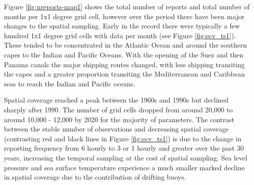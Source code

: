 Figure \ref{fig:nreports-map1} shows the total number of reports and total number of months per 1x1 degree grid cell, however over the period \datatimerange{} there have been major changes to the spatial sampling.
Early in the record there were typically a few hundred 1x1 degree grid cells with data per month (see Figure \ref{fig:ecv_ts1}).
These tended to be concentrated in the Atlantic Ocean and around the southern capes to the Indian and Pacific Oceans.
With the opening of the Suez and then Panama canals the major shipping routes changed, with less shipping transiting the capes and a greater proportion transiting the Mediterranean and Caribbean seas to reach the Indian and Pacific oceans.

Spatial coverage reached a peak between the 1960s and 1990s but declined sharply after 1990.
The number of grid cells dropped from around 20,000 to around 10,000 - 12,000 by 2020 for the majority of parameters. 
The contrast between the stable number of observations and decreasing spatial coverage (contrasting red and black lines in Figure \ref{fig:ecv_ts1}) is due to the change in reporting frequency from 6 hourly to 3 or 1 hourly and greater over the past 30 years, increasing the temporal sampling at the cost of spatial sampling.
Sea level pressure and sea surface temperature experience a much smaller marked decline in spatial coverage due to the contribution of drifting buoys.



